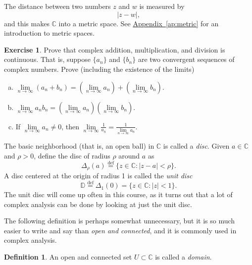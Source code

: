\documentclass[12pt,openany]{book}
\newcommand{\dist}{\operatorname{dist}}
\newcommand{\sabs}[1]{\lvert {#1} \rvert}
\newcommand{\C}{{\mathbb{C}}}
\newcommand{\D}{{\mathbb{D}}}
\newcommand{\myindex}[1]{#1\index{#1}}
\theoremstyle{plain}
\theoremstyle{remark}
\theoremstyle{definition}
\newtheorem{defn}[thm]{Definition}
\newenvironment{exbox}{%
    \def\FrameCommand{\vrule width 1pt \relax\hspace {10pt}}%
    \MakeFramed {\advance \hsize -\width \FrameRestore }%
}{%
    \endMakeFramed
}
\newenvironment{exparts}{%
    \leavevmode\begin{enumerate}[a),noitemsep,topsep=0pt,parsep=0pt,partopsep=0pt]
}{%
    \end{enumerate}
}
\theoremstyle{exercise}
\newtheorem{exercise}{Exercise}[section]
\theoremstyle{example}
\newcommand{\Appendixref}[1]{\hyperref[#1]{Appendix~\ref*{#1}}}
\begin{document}
The distance between two numbers $z$ and $w$ is measured by
\begin{equation*}
\sabs{z-w} ,
\end{equation*}
and this makes $\C$ into a metric space.  See \Appendixref{ap:metric}
for an introduction to metric spaces.

\begin{exbox}
\begin{exercise}
Prove that complex addition, multiplication, and division is continuous.
That is, suppose $\{ a_n \}$ and $\{ b_n \}$ are two convergent sequences
of complex numbers.  Prove (including the existence of the limits)
\begin{exparts}
\item
$\lim\limits_{n\to\infty} (a_n + b_n) = 
\left(\lim\limits_{n\to\infty} a_n \right) +
\left(\lim\limits_{n\to\infty} b_n \right)$.
\item
$\lim\limits_{n\to\infty} a_n b_n = 
\left(\lim\limits_{n\to\infty} a_n \right)
\left(\lim\limits_{n\to\infty} b_n \right)$.
\item
If $\lim\limits_{n\to\infty} a_n \not= 0$, then
$\lim\limits_{n\to\infty} \frac{1}{a_n} = \frac{1}{\lim\limits_{n\to\infty}
a_n}$.
\end{exparts}
\end{exercise}
\end{exbox}

The basic neighborhood (that is, an
open ball) in $\C$
is called a \emph{\myindex{disc}}.
Given $a \in \C$ and $\rho > 0$, define the disc of radius $\rho$ around
$a$
as
%
\begin{equation*}
\Delta_\rho(a)
\overset{\text{def}}{=}
\bigl\{ z \in \C : \sabs{z-a} < \rho \bigr\} .
\end{equation*}
A disc centered at the origin of radius 1 is called the
\emph{\myindex{unit disc}}
%
\begin{equation*}
\D
\overset{\text{def}}{=}
\Delta_1(0)
=
\bigl\{ z \in \C : \sabs{z} < 1 \bigr\} .
\end{equation*}
The unit disc will come up often in this course, as it turns out that
a lot of complex analysis can be done by looking at just the unit disc.

The following definition is perhaps somewhat unnecessary, but it is so much
easier to write and say than \emph{open and connected}, and it is commonly
used in complex analysis.

\begin{defn}
An open and connected set $U \subset \C$ is called a
\emph{\myindex{domain}}.
\end{defn}
\end{document}
